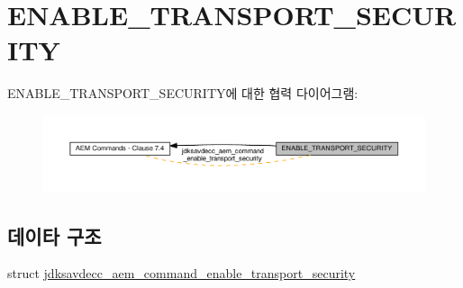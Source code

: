 \hypertarget{group__command__enable__transport__security}{}\section{E\+N\+A\+B\+L\+E\+\_\+\+T\+R\+A\+N\+S\+P\+O\+R\+T\+\_\+\+S\+E\+C\+U\+R\+I\+TY}
\label{group__command__enable__transport__security}
E\+N\+A\+B\+L\+E\+\_\+\+T\+R\+A\+N\+S\+P\+O\+R\+T\+\_\+\+S\+E\+C\+U\+R\+I\+T\+Y에 대한 협력 다이어그램\+:
\nopagebreak
\begin{figure}[H]
\begin{center}
\leavevmode
\includegraphics[width=350pt]{group__command__enable__transport__security}
\end{center}
\end{figure}
\subsection*{데이타 구조}
\begin{DoxyCompactItemize}
\item 
struct \hyperlink{structjdksavdecc__aem__command__enable__transport__security}{jdksavdecc\+\_\+aem\+\_\+command\+\_\+enable\+\_\+transport\+\_\+security}
\end{DoxyCompactItemize}
